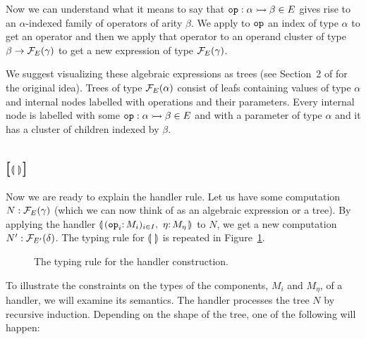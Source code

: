 Now we can understand what it means to say that
$\mathtt{op} : \alpha \rightarrowtail \beta \in E$ gives rise to an $\alpha$-indexed
family of operators of arity $\beta$. We apply to $\mathtt{op}$ an index of
type $\alpha$ to get an operator and then we apply that operator to an
operand cluster of type $\beta \to \mathcal{F}_E(\gamma)$ to get a new expression
of type $\mathcal{F}_E(\gamma)$.

We suggest visualizing these algebraic expressions as trees (see Section~2
of \cite{lindley2014algebraic} for the original idea). Trees of type
$\mathcal{F}_E(\alpha)$ consist of leafs containing values of type $\alpha$ and
internal nodes labelled with operations and their parameters. Every
internal node is labelled with some $\mathtt{op} : \alpha \rightarrowtail \beta \in E$ and
with a parameter of type $\alpha$ and it has a cluster of children indexed
by $\beta$.

\subsection*{[$\llparenthesis \,  \, \rrparenthesis$]}

Now we are ready to explain the handler rule. Let us have some computation
$N : \mathcal{F}_E(\gamma)$ (which we can now think of as an algebraic expression
or a tree). By applying the handler $\cibanana$ to $N$, we get a new
computation $N' : \mathcal{F}_{E'}(\delta)$. The typing rule for $\llparenthesis \,  \, \rrparenthesis$ is
repeated in Figure~\ref{fig:handler-rule}.

\begin{figure}
  \handlerrule
  \caption{\label{fig:handler-rule} The typing rule for the handler
    construction.}
\end{figure}

To illustrate the constraints on the types of the components, $M_i$ and
$M_\eta$, of a handler, we will examine its semantics. The handler
processes the tree $N$ by recursive induction. Depending on the shape of
the tree, one of the following will happen:


